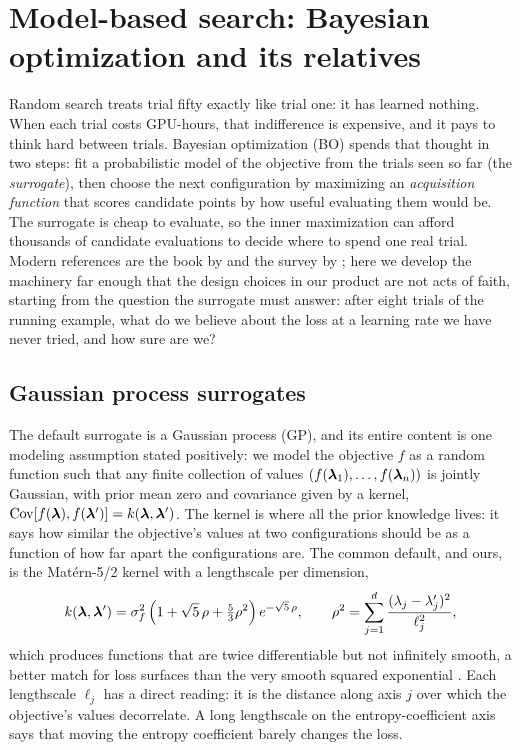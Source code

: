 \chapter{Model-based search: Bayesian optimization and its relatives}
\label{sec:bayesian}

Random search treats trial fifty exactly like trial one: it has learned
nothing. When each trial costs GPU-hours, that indifference is expensive,
and it pays to think hard between trials. Bayesian optimization (BO) spends
that thought in two steps: fit a probabilistic model of the objective from
the trials seen so far (the \emph{surrogate}), then choose the next
configuration by maximizing an \emph{acquisition function} that scores
candidate points by how useful evaluating them would be. The surrogate is
cheap to evaluate, so the inner maximization can afford thousands of
candidate evaluations to decide where to spend one real trial. Modern
references are the book by \citet{garnett2023bayesoptbook} and the survey by
\citet{shahriari2016taking}; here we develop the machinery far enough that
the design choices in our product are not acts of faith, starting from the
question the surrogate must answer: after eight trials of the running
example, what do we believe about the loss at a learning rate we have never
tried, and how sure are we?

\section{Gaussian process surrogates}
\label{sec:gp}

The default surrogate is a Gaussian process (GP), and its entire content is
one modeling assumption stated positively: we model the objective $f$ as a
random function such that any finite collection of values
$(f(\bm{\lambda}_1), \dots, f(\bm{\lambda}_n))$ is jointly Gaussian, with prior mean
zero and covariance given by a kernel,
$\operatorname{Cov}[f(\bm{\lambda}), f(\bm{\lambda}')] = k(\bm{\lambda}, \bm{\lambda}')$. The
kernel is where all the prior knowledge lives: it says how similar the
objective's values at two configurations should be as a function of how far
apart the configurations are. The common default, and ours, is the
Mat\'ern-5/2 kernel with a lengthscale per dimension,
\begin{equation}
k(\bm{\lambda}, \bm{\lambda}')
= \sigma_f^2 \left( 1 + \sqrt{5}\,\rho + \tfrac{5}{3}\rho^2 \right)
  e^{-\sqrt{5}\,\rho},
\qquad
\rho^2 = \sum_{j=1}^{d} \frac{(\lambda_j - \lambda'_j)^2}{\ell_j^2},
\label{eq:matern}
\end{equation}
which produces functions that are twice differentiable but not infinitely
smooth, a better match for loss surfaces than the very smooth squared
exponential \citep{rasmussen2006gaussian}. Each lengthscale $\ell_j$ has a
direct reading: it is the distance along axis $j$ over which the objective's
values decorrelate. A long lengthscale on the entropy-coefficient axis says
that moving the entropy coefficient barely changes the loss.

